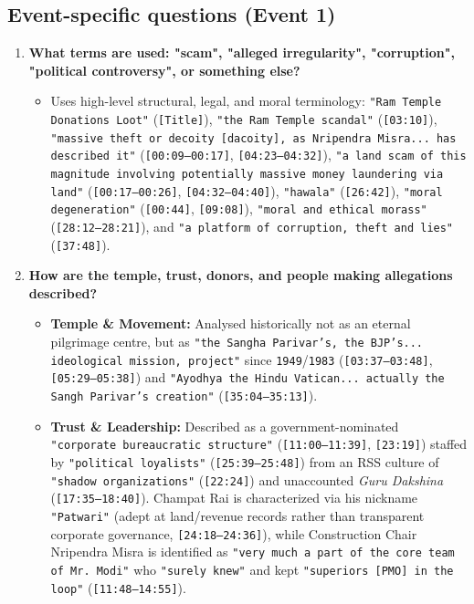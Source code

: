 \documentclass[10pt,a4paper]{article}
\begin{document}
\subsection*{Event-specific questions (Event 1)}
\begin{enumerate}[leftmargin=1.6em, itemsep=4pt, topsep=4pt]
  \item \textbf{What terms are used: "scam", "alleged irregularity", "corruption", "political controversy", or something else?}
  \begin{itemize}[leftmargin=1.4em, itemsep=2pt, topsep=2pt]
    \item Uses high-level structural, legal, and moral terminology: \texttt{"Ram Temple Donations Loot"} (\texttt{[Title]}), \texttt{"the Ram Temple scandal"} (\texttt{[03:10]}), \texttt{"massive theft or decoity [dacoity], as Nripendra Misra... has described it"} (\texttt{[00:09--00:17]}, \texttt{[04:23--04:32]}), \texttt{"a land scam of this magnitude involving potentially massive money laundering via land"} (\texttt{[00:17--00:26]}, \texttt{[04:32--04:40]}), \texttt{"hawala"} (\texttt{[26:42]}), \texttt{"moral degeneration"} (\texttt{[00:44]}, \texttt{[09:08]}), \texttt{"moral and ethical morass"} (\texttt{[28:12--28:21]}), and \texttt{"a platform of corruption, theft and lies"} (\texttt{[37:48]}).
  \end{itemize}
  \item \textbf{How are the temple, trust, donors, and people making allegations described?}
  \begin{itemize}[leftmargin=1.4em, itemsep=2pt, topsep=2pt]
    \item \textbf{Temple \& Movement:} Analysed historically not as an eternal pilgrimage centre, but as \texttt{"the Sangha Parivar's, the BJP's... ideological mission, project"} since \texttt{1949}/\texttt{1983} (\texttt{[03:37--03:48]}, \texttt{[05:29--05:38]}) and \texttt{"Ayodhya the Hindu Vatican... actually the Sangh Parivar's creation"} (\texttt{[35:04--35:13]}).
    \item \textbf{Trust \& Leadership:} Described as a government-nominated \texttt{"corporate bureaucratic structure"} (\texttt{[11:00--11:39]}, \texttt{[23:19]}) staffed by \texttt{"political loyalists"} (\texttt{[25:39--25:48]}) from an RSS culture of \texttt{"shadow organizations"} (\texttt{[22:24]}) and unaccounted \textit{Guru Dakshina} (\texttt{[17:35--18:40]}). Champat Rai is characterized via his nickname \texttt{"Patwari"} (adept at land/revenue records rather than transparent corporate governance, \texttt{[24:18--24:36]}), while Construction Chair Nripendra Misra is identified as \texttt{"very much a part of the core team of Mr. Modi"} who \texttt{"surely knew"} and kept \texttt{"superiors [PMO] in the loop"} (\texttt{[11:48--14:55]}).

\end{itemize}
\end{enumerate}
\end{document}
